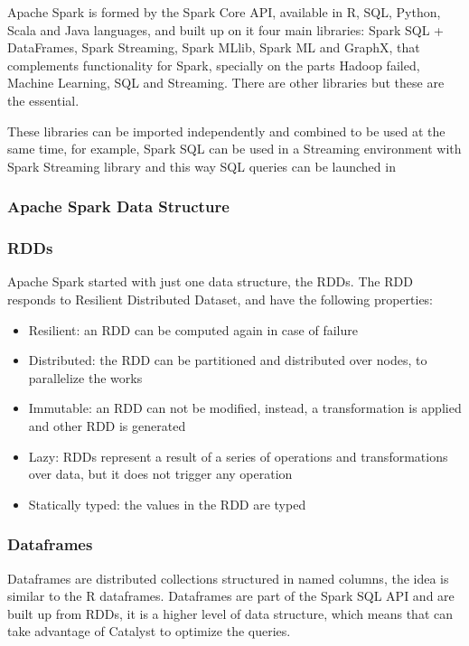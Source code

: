 \documentclass[11pt]{article} %
\begin{document}
      Apache Spark is formed by the Spark Core API, available in R, SQL, Python, Scala and Java languages, and built up on it four main libraries: Spark SQL + DataFrames, Spark Streaming, Spark MLlib, Spark ML and GraphX, that complements functionality for Spark, specially on the parts Hadoop failed, Machine Learning, SQL and Streaming. There are other libraries but these are the essential.

      These libraries can be imported independently and combined to be used at the same time, for example, Spark SQL can be used in a Streaming environment with Spark Streaming library and this way SQL queries can be launched in

    \subsubsection{Apache Spark Data Structure}

      \subsubsection*{RDDs}

        Apache Spark started with just one data structure, the RDDs. The RDD responds to Resilient Distributed Dataset, and have the following properties:

        \begin{itemize}
          \item Resilient: an RDD can be computed again in case of failure
          \item Distributed: the RDD can be partitioned and distributed over nodes, to parallelize the works
          \item Immutable: an RDD can not be modified, instead, a transformation is applied and other RDD is generated
          \item Lazy: RDDs represent a result of a series of operations and transformations over data, but it does not trigger any operation
          \item Statically typed: the values in the RDD are typed
        \end{itemize}

      \subsubsection*{Dataframes}

        Dataframes are distributed collections structured in named columns, the idea is similar to the R dataframes. Dataframes are part of the Spark SQL API and are built up from RDDs, it is a higher level of data structure, which means that can take advantage of Catalyst to optimize the queries.
\end{document}
